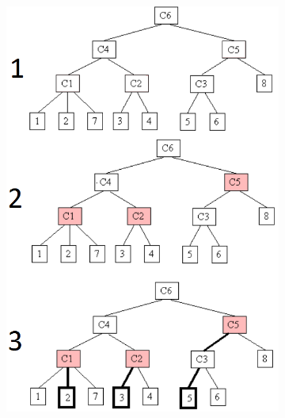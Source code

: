 \begin{figure}[h!]
  \centering
  \begin{subfigure}[b]{0.35\textwidth}
    \centering
    \includegraphics[width=\textwidth]{images/vhdr1.png}
    \caption{}
    \label{fig:vhdr1}
  \end{subfigure}%
  \hspace{1cm} %
  \begin{subfigure}[b]{0.5\textwidth}
    \centering

\end{subfigure}
\end{figure}
